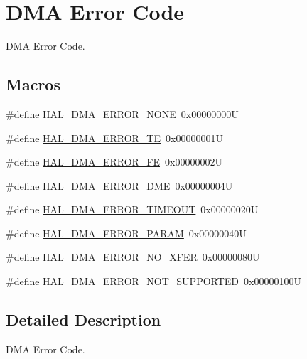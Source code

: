 \hypertarget{group___d_m_a___error___code}{}\section{D\+MA Error Code}
\label{group___d_m_a___error___code}


D\+MA Error Code.  


\subsection*{Macros}
\begin{DoxyCompactItemize}
\item 
\#define \mbox{\hyperlink{group___d_m_a___error___code_gaad4009390bfbe05a1bb7115d03c25a97}{H\+A\+L\+\_\+\+D\+M\+A\+\_\+\+E\+R\+R\+O\+R\+\_\+\+N\+O\+NE}}~0x00000000U
\item 
\#define \mbox{\hyperlink{group___d_m_a___error___code_ga9882442c5f8f0170917934bbee1cc92d}{H\+A\+L\+\_\+\+D\+M\+A\+\_\+\+E\+R\+R\+O\+R\+\_\+\+TE}}~0x00000001U
\item 
\#define \mbox{\hyperlink{group___d_m_a___error___code_ga019411712b9aee1d34b57d029a461fa4}{H\+A\+L\+\_\+\+D\+M\+A\+\_\+\+E\+R\+R\+O\+R\+\_\+\+FE}}~0x00000002U
\item 
\#define \mbox{\hyperlink{group___d_m_a___error___code_gabac48184446aea8f467483382fc6689b}{H\+A\+L\+\_\+\+D\+M\+A\+\_\+\+E\+R\+R\+O\+R\+\_\+\+D\+ME}}~0x00000004U
\item 
\#define \mbox{\hyperlink{group___d_m_a___error___code_ga6cf6a5b8881ff36ed4316a29bbfb5b79}{H\+A\+L\+\_\+\+D\+M\+A\+\_\+\+E\+R\+R\+O\+R\+\_\+\+T\+I\+M\+E\+O\+UT}}~0x00000020U
\item 
\#define \mbox{\hyperlink{group___d_m_a___error___code_ga5aaaad3b88a77147d1e3daa3a3ad9e60}{H\+A\+L\+\_\+\+D\+M\+A\+\_\+\+E\+R\+R\+O\+R\+\_\+\+P\+A\+R\+AM}}~0x00000040U
\item 
\#define \mbox{\hyperlink{group___d_m_a___error___code_gab7526e686427f26bf3b6af062d5a690b}{H\+A\+L\+\_\+\+D\+M\+A\+\_\+\+E\+R\+R\+O\+R\+\_\+\+N\+O\+\_\+\+X\+F\+ER}}~0x00000080U
\item 
\#define \mbox{\hyperlink{group___d_m_a___error___code_ga7432f31f9972e1c0a398a3f20587d118}{H\+A\+L\+\_\+\+D\+M\+A\+\_\+\+E\+R\+R\+O\+R\+\_\+\+N\+O\+T\+\_\+\+S\+U\+P\+P\+O\+R\+T\+ED}}~0x00000100U
\end{DoxyCompactItemize}


\subsection{Detailed Description}
D\+MA Error Code. 



